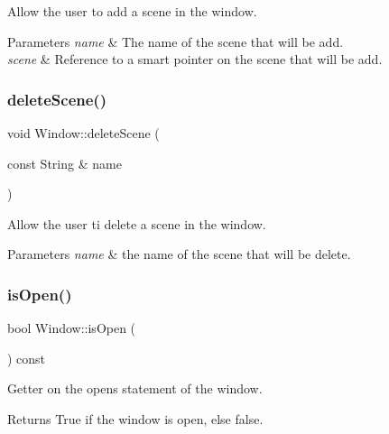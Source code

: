 Allow the user to add a scene in the window. 


\begin{DoxyParams}{Parameters}
{\em name} & The name of the scene that will be add. \\
\hline
{\em scene} & Reference to a smart pointer on the scene that will be add. \\
\hline
\end{DoxyParams}
\mbox{\label{classWindow_ad3a1ead02eca314e2df94e3e932fb5ae}} 
\subsubsection{\texorpdfstring{delete\+Scene()}{deleteScene()}}
{\footnotesize\ttfamily void Window\+::delete\+Scene (\begin{DoxyParamCaption}\item[{const String \&}]{name }\end{DoxyParamCaption})}



Allow the user ti delete a scene in the window. 


\begin{DoxyParams}{Parameters}
{\em \textquotesingle{}name\textquotesingle{}} & the name of the scene that will be delete. \\
\hline
\end{DoxyParams}
\mbox{\label{classWindow_a761d614931fb5a5daa70e4f580c3e78e}} 
\subsubsection{\texorpdfstring{is\+Open()}{isOpen()}}
{\footnotesize\ttfamily bool Window\+::is\+Open (\begin{DoxyParamCaption}{ }\end{DoxyParamCaption}) const}



Getter on the open\textquotesingle{}s statement of the window. 

\begin{DoxyReturn}{Returns}
True if the window is open, else false. 
\end{DoxyReturn}
\mbox{\label{classWindow_a9c9f1fd6ebc2b93f16ca870487a4a4c6}} 

